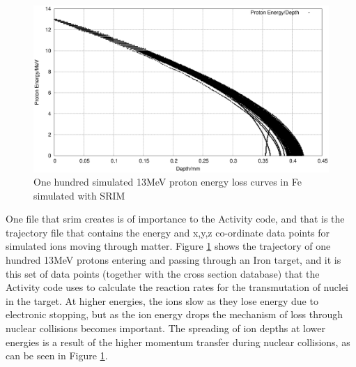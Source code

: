 \begin{figure}
  \begin{center}
    \includegraphics[width=.7\linewidth]{chapters/isotope_activation_and_radioactive_decay/plots/fe_13MeV.eps}
    \caption{One hundred simulated 13MeV proton energy loss curves in Fe simulated with SRIM \cite{srim}}
    \label{fig:fe13traj}
  \end{center}
\end{figure}

One file that \acrshort{srim} creates is of importance to the Activity code, and that is the trajectory file that contains the energy and x,y,z co-ordinate data points for simulated ions moving through matter.  Figure \ref{fig:fe13traj} shows the trajectory of one hundred 13MeV protons entering and passing through an Iron target, and it is this set of data points (together with the cross section database) that the Activity code uses to calculate the reaction rates for the transmutation of nuclei in the target.  At higher energies, the ions slow as they lose energy due to electronic stopping, but as the ion energy drops the mechanism of loss through nuclear collisions becomes important.  The spreading of ion depths at lower energies is a result of the higher momentum transfer during nuclear collisions, as can be seen in Figure \ref{fig:fe13traj}.









